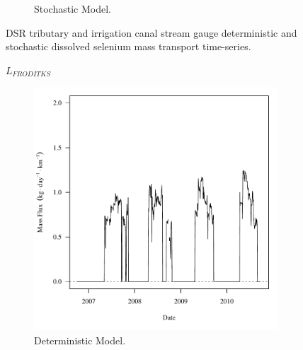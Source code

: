 \begin{linenumbers}
\begin{landscape}
\begin{figure}
\begin{subfigure}{0.7\textwidth}
			\caption{Stochastic Model.}
		\end{subfigure}
		\caption{DSR tributary and irrigation canal stream gauge deterministic and stochastic dissolved selenium mass transport time-series.}
	\end{figure}
\end{landscape}
\subfiguremid
\begin{landscape}
	\begin{figure}
		$ \displaystyle L_{FRODITKS} $
		\begin{subfigure}{0.7\textwidth}
			\centering
			\includegraphics[width=\tableCustomSize]{"Figures/Results_DSR/Deterministic/f FRO"}
			\caption{Deterministic Model.}
		\end{subfigure}%
		\begin{subfigure}{0.7\textwidth}
			\centering

\end{subfigure}
\end{figure}
\end{landscape}
\end{linenumbers}
